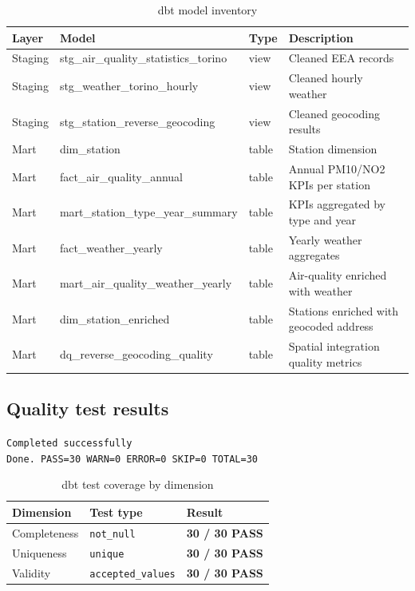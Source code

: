 \documentclass[11pt,a4paper]{article}
\begin{document}
\begin{table}[h!]
\centering
\caption{dbt model inventory}
\small
{}
\begin{tabularx}{\textwidth}{@{}lllX@{}}
\toprule
\textbf{Layer} & \textbf{Model} & \textbf{Type} & \textbf{Description} \\
\midrule
Staging & stg\_air\_quality\_statistics\_torino & view  & Cleaned EEA records \\
Staging & stg\_weather\_torino\_hourly          & view  & Cleaned hourly weather \\
Staging & stg\_station\_reverse\_geocoding      & view  & Cleaned geocoding results \\
\midrule
Mart & dim\_station                         & table & Station dimension \\
Mart & fact\_air\_quality\_annual           & table & Annual PM10/NO2 KPIs per station \\
Mart & mart\_station\_type\_year\_summary   & table & KPIs aggregated by type and year \\
Mart & fact\_weather\_yearly               & table & Yearly weather aggregates \\
Mart & mart\_air\_quality\_weather\_yearly  & table & Air-quality enriched with weather \\
Mart & dim\_station\_enriched              & table & Stations enriched with geocoded address \\
Mart & dq\_reverse\_geocoding\_quality     & table & Spatial integration quality metrics \\
\bottomrule
\end{tabularx}
\end{table}

\subsection{Quality test results}

\begin{tcolorbox}[successbox,title=Expected dbt test output]
\texttt{Completed successfully}\\
\texttt{Done. PASS=30 WARN=0 ERROR=0 SKIP=0 TOTAL=30}
\end{tcolorbox}

\begin{table}[h!]
\centering
\caption{dbt test coverage by dimension}
\small
{}
\begin{tabular}{@{}lll@{}}
\toprule
\textbf{Dimension} & \textbf{Test type} & \textbf{Result} \\
\midrule
Completeness & \texttt{not\_null}         & \textcolor{accentgreen}{\bfseries 30 / 30 PASS} \\
Uniqueness   & \texttt{unique}            & \textcolor{accentgreen}{\bfseries 30 / 30 PASS} \\
Validity     & \texttt{accepted\_values}  & \textcolor{accentgreen}{\bfseries 30 / 30 PASS} \\
\bottomrule
\end{tabular}
\end{table}
\end{document}

